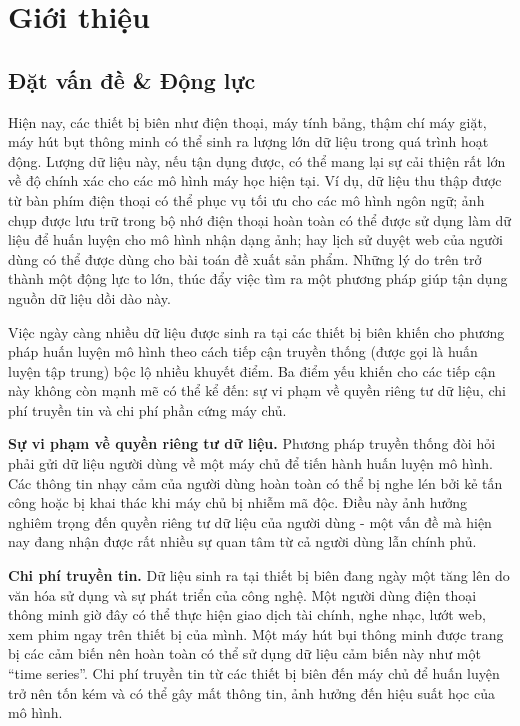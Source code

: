 \chapter{Giới thiệu}
\label{Chapter1}

\section{Đặt vấn đề \& Động lực}

Hiện nay, các thiết bị biên như điện thoại, máy tính bảng, thậm chí máy giặt, máy hút bụt thông minh có thể sinh ra lượng lớn dữ liệu trong quá trình hoạt động. Lượng dữ liệu này, nếu tận dụng được, có thể mang lại sự cải thiện rất lớn về độ chính xác cho các mô hình máy học hiện tại. Ví dụ, dữ liệu thu thập được từ bàn phím điện thoại có thể phục vụ tối ưu cho các mô hình ngôn ngữ; ảnh chụp được lưu trữ trong bộ nhớ điện thoại hoàn toàn có thể được sử dụng làm dữ liệu để huấn luyện cho mô hình nhận dạng ảnh; hay lịch sử duyệt web của người dùng có thể được dùng cho bài toán đề xuất sản phẩm. Những lý do trên trở thành một động lực to lớn, thúc đẩy việc tìm ra một phương pháp giúp tận dụng nguồn dữ liệu dồi dào này.

Việc ngày càng nhiều dữ liệu được sinh ra tại các thiết bị biên khiến cho phương pháp huấn luyện mô hình theo cách tiếp cận truyền thống (được gọi là huấn luyện tập trung) bộc lộ nhiều khuyết điểm. Ba điểm yếu khiến cho các tiếp cận này không còn mạnh mẽ có thể kể đến: sự vi phạm về quyền riêng tư dữ liệu, chi phí truyền tin và chi phí phần cứng máy chủ.

\textbf{Sự vi phạm về quyền riêng tư dữ liệu.} Phương pháp truyền thống đòi hỏi phải gửi dữ liệu người dùng về một máy chủ để tiến hành huấn luyện mô hình. Các thông tin nhạy cảm của người dùng hoàn toàn có thể bị nghe lén bởi kẻ tấn công hoặc bị khai thác khi máy chủ bị nhiễm mã độc. Điều này ảnh hưởng nghiêm trọng đến quyền riêng tư dữ liệu của người dùng - một vấn đề mà hiện nay đang nhận được rất nhiều sự quan tâm từ cả người dùng lẫn chính phủ.

\textbf{Chi phí truyền tin.} Dữ liệu sinh ra tại thiết bị biên đang ngày một tăng lên do văn hóa sử dụng và sự phát triển của công nghệ. Một người dùng điện thoại thông minh giờ đây có thể thực hiện giao dịch tài chính, nghe nhạc, lướt web, xem phim ngay trên thiết bị của mình. Một máy hút bụi thông minh được trang bị các cảm biến nên hoàn toàn có thể sử dụng dữ liệu cảm biến này như một “time series”. Chi phí truyền tin từ các thiết bị biên đến máy chủ để huấn luyện trở nên tốn kém và có thể gây mất thông tin, ảnh hưởng đến hiệu suất học của mô hình.

